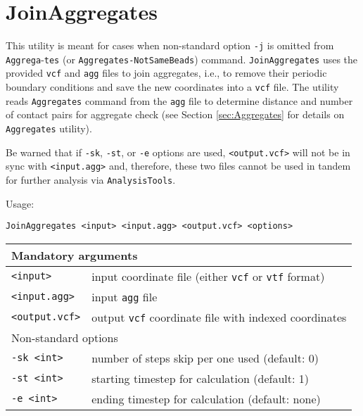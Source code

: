 \section{JoinAggregates} \label{sec:JoinAggregates}

This utility is meant for cases when non-standard option \texttt{-j} is
omitted from \texttt{Aggrega}-\texttt{tes} (or
\texttt{Aggregates-NotSameBeads}) command. \texttt{JoinAggregates} uses the
provided \texttt{vcf} and \texttt{agg} files to join aggregates, i.e., to
remove their periodic boundary conditions and save the new coordinates into
a \texttt{vcf} file. The utility reads \texttt{Aggregates} command from the
\texttt{agg} file to determine distance and number of contact pairs for
aggregate check (see Section \ref{sec:Aggregates} for details on
\texttt{Aggregates} utility).

Be warned that if \texttt{-sk}, \texttt{-st}, or \texttt{-e} options are
used, \texttt{<output.vcf>} will not be in sync with \texttt{<input.agg>}
and, therefore, these two files cannot be used in tandem for further
analysis via \texttt{AnalysisTools}.

Usage:

\vspace{1em}
\noindent
\texttt{JoinAggregates <input> <input.agg> <output.vcf> <options>}

\vspace{1em}
\noindent
\begin{longtable}{p{}p{}}
  \toprule
  \multicolumn{2}{l}{Mandatory arguments} \\
  \midrule
  \texttt{<input>} & input coordinate file (either \texttt{vcf} or
    \texttt{vtf} format) \\
  \texttt{<input.agg>} & input \texttt{agg} file \\
  \texttt{<output.vcf>} & output \texttt{vcf} coordinate file with indexed
    coordinates \\
  \toprule
  \multicolumn{2}{l}{Non-standard options} \\
  \midrule
  \texttt{-sk <int>} & number of steps skip per one used (default: 0) \\
  \texttt{-st <int>} & starting timestep for calculation (default: 1) \\
  \texttt{-e <int>} & ending timestep for calculation (default: none) \\
  \bottomrule
\end{longtable}
